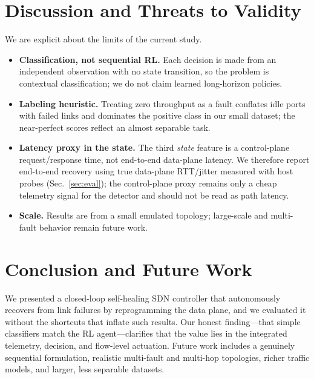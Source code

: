 \documentclass[conference]{IEEEtran}
\begin{document}
\section{Discussion and Threats to Validity}
\label{sec:threats}
We are explicit about the limits of the current study.
\begin{itemize}
  \item \textbf{Classification, not sequential RL.} Each decision is made from an
  independent observation with no state transition, so the problem is contextual
  classification; we do not claim learned long-horizon policies.
  \item \textbf{Labeling heuristic.} Treating zero throughput as a fault conflates
  idle ports with failed links and dominates the positive class in our small
  dataset; the near-perfect scores reflect an almost separable task.
  \item \textbf{Latency proxy in the state.} The third \emph{state} feature is a
  control-plane request/response time, not end-to-end data-plane latency. We
  therefore report end-to-end recovery using true data-plane RTT/jitter measured
  with host probes (Sec.~\ref{sec:eval}); the control-plane proxy remains only a
  cheap telemetry signal for the detector and should not be read as path latency.
  \item \textbf{Scale.} Results are from a small emulated topology; large-scale and
  multi-fault behavior remain future work.
\end{itemize}

\section{Conclusion and Future Work}
We presented a closed-loop self-healing SDN controller that autonomously recovers
from link failures by reprogramming the data plane, and we evaluated it without the
shortcuts that inflate such results. Our honest finding---that simple classifiers
match the RL agent---clarifies that the value lies in the integrated telemetry,
decision, and flow-level actuation. Future work includes a genuinely sequential
formulation, realistic multi-fault and multi-hop topologies, richer traffic
models, and larger, less separable datasets.



\end{document}
